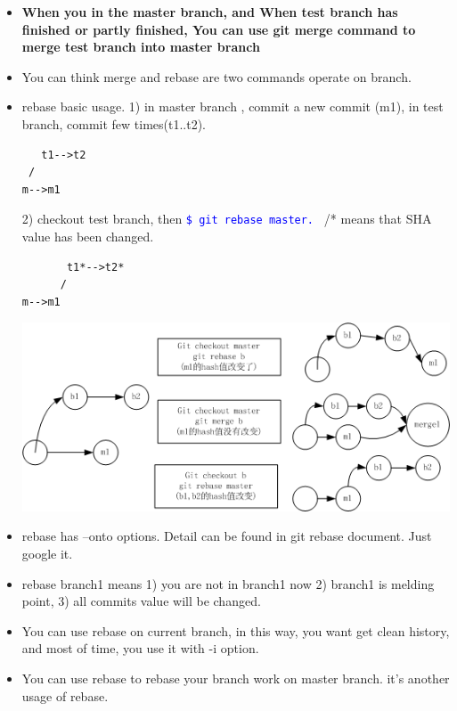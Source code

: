 \documentclass[a4paper,11pt,twoside]{book}
\newcommand{\linuxcommand}[1]{\texttt{\textcolor{blue}{\$ #1 \Pisymbol{psy}{191}}}}
\begin{document}
\begin{itemize}
\item \textbf{When you in the master branch, and When test branch has finished or partly finished, You can use git merge command to merge test branch into master branch}

\item You can think merge and rebase are two commands operate on branch.

\item rebase basic usage.
1) in master  branch , commit a new commit (m1), in test branch, commit few times(t1..t2). \\
\begin{verbatim}
   t1-->t2
 /
m-->m1
\end{verbatim}
2) checkout test branch, then \linuxcommand{git rebase master.} /* means that SHA value has been changed.\\
\begin{verbatim}
       t1*-->t2*
      /
m-->m1
\end{verbatim}

\includegraphics[scale=0.7]{pics/Git_rebase} \\

\item rebase has --onto options. Detail can be found in git rebase document. Just google it. 

\item rebase branch1 means 1) you are not in branch1 now 2) branch1 is melding point, 3) all commits value will be changed. 

\item You can use rebase on current branch, in this way, you want get clean history, and most of time, you use it with -i option. 
\item You can use rebase to rebase your branch work on master branch. it's another usage of rebase. 

\end{itemize}
\end{document}
